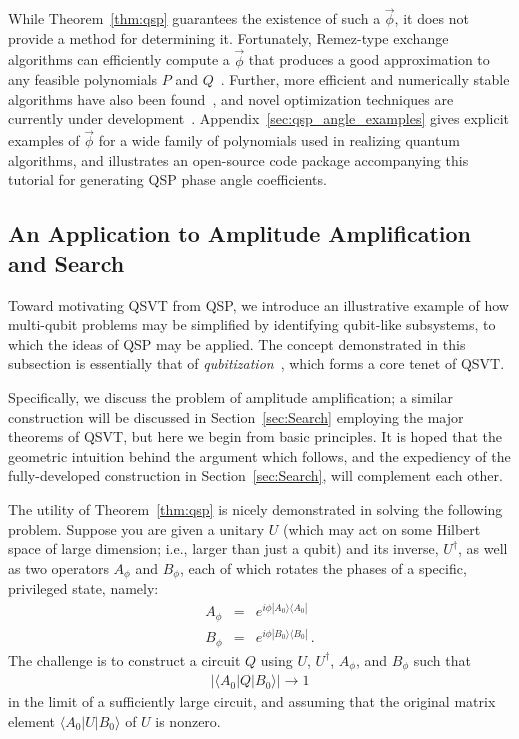 \documentclass[aps,pra,showpacs,notitlepage,twocolumn,superscriptaddress,nofootinbib]{revtex4-1}
\def\>{\rangle}
\def\<{\langle}
\newcommand{\bea}{\begin{eqnarray}}
\newcommand{\eea}{\end{eqnarray}}
\begin{document}
While Theorem~\ref{thm:qsp} guarantees the existence of such a $\vec{\phi}$, it does not provide a method for determining it. Fortunately, Remez-type exchange algorithms can efficiently compute a $\vec{\phi}$ that produces a good approximation to any feasible polynomials $P$ and $Q$~\cite{Low_2016}. Further, more efficient and numerically stable algorithms have also been found~\cite{chao2020finding, Haah_2019, arute2019quantum}, and novel optimization techniques are currently under development~\cite{lin2021optimization}. Appendix~\ref{sec:qsp_angle_examples} gives explicit examples of $\vec{\phi}$ for a wide family of polynomials used in realizing quantum algorithms, and illustrates an open-source code package accompanying this tutorial for generating QSP phase angle coefficients.
        
        
        

\subsection{An Application to Amplitude Amplification and Search}\label{sec:AA_and_search}

    Toward motivating QSVT from QSP, we introduce an illustrative example of how multi-qubit problems may be simplified by identifying qubit-like subsystems, to which the ideas of QSP may be applied. The concept demonstrated in this subsection is essentially that of \emph{qubitization}~\cite{Low_2019}, which forms a core tenet of QSVT. 
    
    Specifically, we discuss the problem of amplitude amplification; a similar construction will be discussed in Section~\ref{sec:Search} employing the major theorems of QSVT, but here we begin from basic principles. It is hoped that the geometric intuition behind the argument which follows, and the expediency of the fully-developed construction in Section~\ref{sec:Search}, will complement each other.

    The utility of Theorem~\ref{thm:qsp} is nicely demonstrated in solving the following problem. Suppose you are given a unitary $U$ (which may act on some Hilbert space of large dimension; i.e., larger than just a qubit) and its inverse, $U^\dagger$, as well as two operators $A_\phi$ and $B_\phi$, each of which rotates the phases of a specific, privileged state, namely:
        \bea
            A_\phi &=& e^{i\phi |A_0\>\<A_0|} 
            \label{eq:aa_aphi}
            \\
            B_\phi &=& e^{i\phi |B_0\>\<B_0|}
            \,.
        \eea
    The challenge is to construct a circuit $Q$ using $U$, $U^\dagger$, $A_\phi$, and $B_\phi$ such that 
        \bea
             |\< A_0 | Q |B_0\>| \longrightarrow 1
        \eea
    in the limit of a sufficiently large circuit, and assuming that the original matrix element $\< A_0 | U |B_0\>$ of $U$ is nonzero.
    
\end{document}
